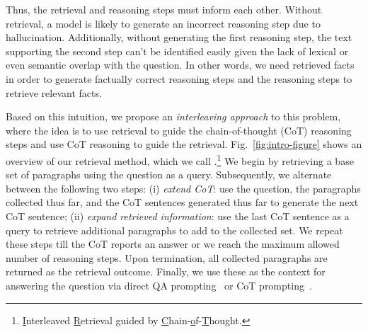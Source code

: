 Thus, the retrieval and reasoning steps must inform each other. Without retrieval, a model is likely to generate an incorrect reasoning step due to hallucination. Additionally, without generating the first reasoning step, the text supporting the second step can't be identified easily given the lack of lexical or even semantic overlap with the question. In other words, we need retrieved facts in order to generate factually correct reasoning steps and the reasoning steps to retrieve relevant facts.

Based on this intuition, we propose an \emph{interleaving approach} to this problem, where the idea is to use retrieval to guide the chain-of-thought (CoT) reasoning steps and use CoT reasoning to guide the retrieval. Fig.~\ref{fig:intro-figure} shows an overview of our retrieval method, which we call \iconsys.\footnote{\underline{I}nterleaved \underline{R}etrieval guided by \underline{C}hain-\underline{o}f-\underline{T}hought.} We begin by retrieving a base set of paragraphs using the question as a query. Subsequently, we alternate between the following two steps: (i) \textit{extend CoT}: use the question, the paragraphs collected thus far, and the CoT sentences generated thus far to generate the next CoT sentence; (ii) \textit{expand retrieved information}: use the last CoT sentence as a query to retrieve additional paragraphs to add to the collected set. We repeat these steps till the CoT reports an answer or we reach the maximum allowed number of reasoning steps. Upon termination, all collected paragraphs are returned as the retrieval outcome. Finally, we use these as the context for answering the question via direct QA prompting~\cite{originalgpt3} or CoT prompting~\cite{cot}.

